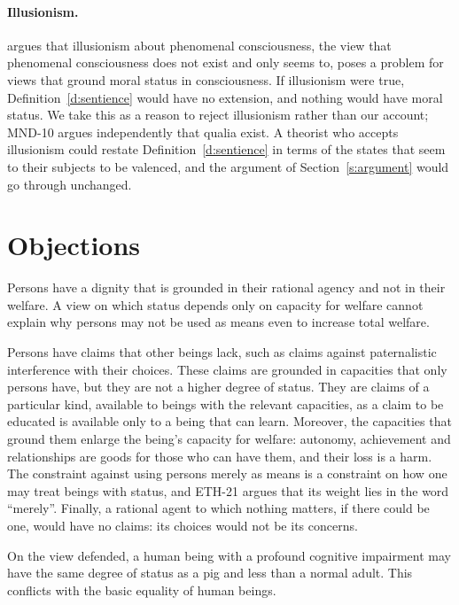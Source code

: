 \documentclass{situationist-preprint}
\begin{document}
\paragraph{Illusionism.} \citet{Kammerer2019} argues that illusionism about phenomenal consciousness, the view that phenomenal consciousness does not exist and only seems to, poses a problem for views that ground moral status in consciousness. If illusionism were true, Definition~\ref{d:sentience} would have no extension, and nothing would have moral status. We take this as a reason to reject illusionism rather than our account; MND-10 argues independently that qualia exist. A theorist who accepts illusionism could restate Definition~\ref{d:sentience} in terms of the states that seem to their subjects to be valenced, and the argument of Section~\ref{s:argument} would go through unchanged.

\section{Objections}\label{s:objections}

\begin{objection}
Persons have a dignity that is grounded in their rational agency and not in their welfare. A view on which status depends only on capacity for welfare cannot explain why persons may not be used as means even to increase total welfare.
\end{objection}

\begin{reply}
Persons have claims that other beings lack, such as claims against paternalistic interference with their choices. These claims are grounded in capacities that only persons have, but they are not a higher degree of status. They are claims of a particular kind, available to beings with the relevant capacities, as a claim to be educated is available only to a being that can learn. Moreover, the capacities that ground them enlarge the being's capacity for welfare: autonomy, achievement and relationships are goods for those who can have them, and their loss is a harm. The constraint against using persons merely as means is a constraint on how one may treat beings with status, and ETH-21 argues that its weight lies in the word \enquote{merely}. Finally, a rational agent to which nothing matters, if there could be one, would have no claims: its choices would not be its concerns.
\end{reply}

\begin{objection}[Equality]
On the view defended, a human being with a profound cognitive impairment may have the same degree of status as a pig and less than a normal adult. This conflicts with the basic equality of human beings.
\end{objection}
\end{document}
